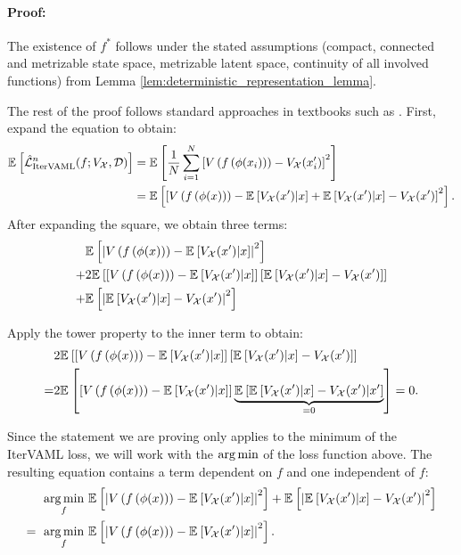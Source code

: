 \paragraph{Proof:}
The existence of $f^*$ follows under the stated assumptions (compact, connected and metrizable state space, metrizable latent space, continuity of all involved functions) from Lemma \autoref{lem:deterministic_representation_lemma}.

The rest of the proof follows standard approaches in textbooks such as \cite{Gyrfi2002ADT}. 
First, expand the equation to obtain:
\begin{align*}
    \mathbb{E}_{}\left[  \hat{\mathcal{L}}^n_\text{IterVAML}(f; V_\mathcal{X}, \mathcal{D}) \right] &= \mathbb{E}_{}\left[  \frac{1}{N}\sum_{i=1}^N\left[ V\left( f\left( \phi(x_i) \right) \right) - V_\mathcal{X}(x'_i)  \right]^2 \right]\\
    &= \mathbb{E}_{}\left[  \left[ V\left( f\left( \phi(x) \right) \right) - \mathbb{E}_{}\left[  V_\mathcal{X}(x')\middle|x \right] + \mathbb{E}_{}\left[  V_\mathcal{X}(x')\middle|x \right] - V_\mathcal{X}(x')  \right]^2 \right].
\end{align*}
After expanding the square, we obtain three terms:
\begin{align*}
    &\mathbb{E}_{}\left[  \left|{V\left( f\left( \phi(x) \right) \right) - \mathbb{E}_{}\left[  V_\mathcal{X}(x')\middle|x \right]}\right|^2 \right] \\
+ &2\mathbb{E}_{}\left[  \left[ V\left( f\left( \phi(x) \right) \right) - \mathbb{E}_{}\left[  V_\mathcal{X}(x')\middle|x \right] \right]\left[ \mathbb{E}_{}\left[  V_\mathcal{X}(x')\middle|x \right] - V_\mathcal{X}(x')  \right] \right]\\
    + &\mathbb{E}_{}\left[  \left|{\mathbb{E}_{}\left[  V_\mathcal{X}(x')\middle|x \right] - V_\mathcal{X}(x') }\right|^2 \right]\\
\end{align*}

Apply the tower property to the inner term to obtain: 
\begin{align*}
&2\mathbb{E}_{}\left[  \left[ V\left( f\left( \phi(x) \right) \right) - \mathbb{E}_{}\left[  V_\mathcal{X}(x')\middle|x \right] \right]\left[ \mathbb{E}_{}\left[  V_\mathcal{X}(x')\middle|x \right] - V_\mathcal{X}(x')  \right] \right]\\
= &2\mathbb{E}_{}\left[  \left[ V\left( f\left( \phi(x) \right) \right) - \mathbb{E}_{}\left[  V_\mathcal{X}(x')\middle|x \right] \right]\underbrace{\mathbb{E}_{}\left[  \mathbb{E}_{}\left[  V_\mathcal{X}(x')\middle|x \right] - V_\mathcal{X}(x') \middle|x' \right]}_{=0} \right] = 0.
\end{align*}

Since the statement we are proving only applies to the minimum of the IterVAML loss, we will work with the $\operatorname*{arg\,min}$ of the loss function above.
The resulting equation contains a term dependent on $f$ and one independent of $f$:
\begin{align*}
    \operatorname*{arg\,min}_f~ & \mathbb{E}_{}\left[  \left|{V\left( f\left( \phi(x) \right) \right) - \mathbb{E}_{}\left[  V_\mathcal{X}(x')\middle|x \right]}\right|^2 \right] + \mathbb{E}_{}\left[  \left|{\mathbb{E}_{}\left[  V_\mathcal{X}(x')\middle|x \right] - V_\mathcal{X}(x') }\right|^2 \right]\\
    =~ \operatorname*{arg\,min}_f~ & \mathbb{E}_{}\left[  \left|{V\left( f\left( \phi(x) \right) \right) - \mathbb{E}_{}\left[  V_\mathcal{X}(x')\middle|x \right]}\right|^2 \right].
\end{align*}

